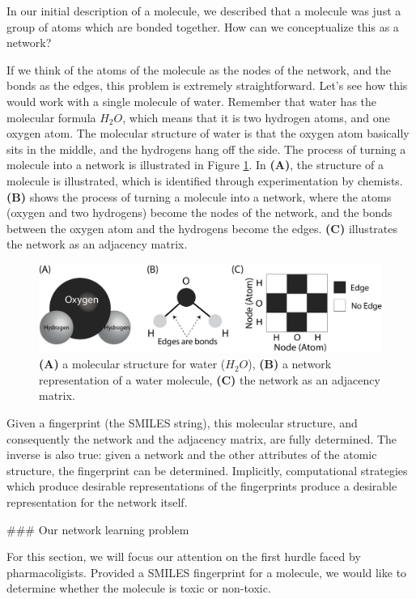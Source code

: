 In our initial description of a molecule, we described that a molecule was just a group of atoms which are bonded together. How can we conceptualize this as a network?

If we think of the atoms of the molecule as the nodes of the network, and the bonds as the edges, this problem is extremely straightforward. Let's see how this would work with a single molecule of water. Remember that water has the molecular formula $H_2O$, which means that it is two hydrogen atoms, and one oxygen atom. The molecular structure of water is that the oxygen atom basically sits in the middle, and the hydrogens hang off the side. The process of turning a molecule into a network is illustrated in Figure \ref{fig:next:molecule}. In \textbf{(A)}, the structure of a molecule is illustrated, which is identified through experimentation by chemists. \textbf{(B)} shows the process of turning a molecule into a network, where the atoms (oxygen and two hydrogens) become the nodes of the network, and the bonds between the oxygen atom and the hydrogens become the edges. \textbf{(C)} illustrates the network as an adjacency matrix.

\begin{figure}
    \centering
    \includegraphics[width=\linewidth]{next/Images/water_molecule.png}
    \caption{\textbf{(A)} a molecular structure for water ($H_2 O$), \textbf{(B)} a network representation of a water molecule, \textbf{(C)} the network as an adjacency matrix.}
    \label{fig:next:molecule}
\end{figure}

Given a fingerprint (the SMILES string), this molecular structure, and consequently the network and the adjacency matrix, are fully determined. The inverse is also true: given a network and the other attributes of the atomic structure, the fingerprint can be determined. Implicitly, computational strategies which produce desirable representations of the fingerprints produce a desirable representation for the network itself.


### Our network learning problem

For this section, we will focus our attention on the first hurdle faced by pharmacoligists. Provided a SMILES fingerprint for a molecule, we would like to determine whether the molecule is toxic or non-toxic.

